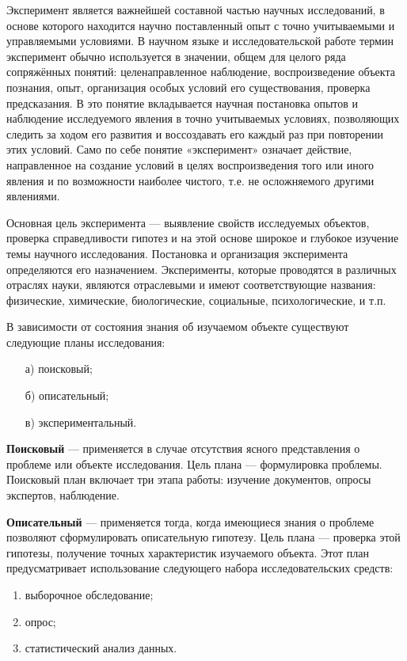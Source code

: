 Эксперимент является важнейшей составной частью научных исследований, в основе которого находится научно поставленный опыт с
точно учитываемыми и управляемыми условиями. В научном языке и
исследовательской работе термин эксперимент обычно используется в
значении, общем для целого ряда сопряжённых понятий: целенаправленное наблюдение, воспроизведение объекта познания, опыт, организация особых условий его существования, проверка предсказания. В это
понятие вкладывается научная постановка опытов и наблюдение исследуемого явления в точно учитываемых условиях, позволяющих следить за ходом его развития и воссоздавать его каждый раз при повторении
этих условий. Само по себе понятие «эксперимент» означает действие,
направленное на создание условий в целях воспроизведения того или
иного явления и по возможности наиболее чистого, т.е. не осложняемого другими явлениями. \cite{lit7}

Основная цель эксперимента --- выявление свойств исследуемых
объектов, проверка справедливости гипотез и на этой основе широкое и
глубокое изучение темы научного исследования. Постановка и организация эксперимента определяются его назначением. Эксперименты, которые проводятся в различных отраслях науки, являются отраслевыми и
имеют соответствующие названия: физические, химические, биологические, социальные, психологические, и т.п.  \cite{lit7}

В зависимости от состояния знания об изучаемом объекте существуют
следующие планы исследования:
\begin{enumerate}
	\item[а)]  поисковый;
	\item[б)]  описательный;
	\item[в)]  экспериментальный.
\end{enumerate}

\textbf{Поисковый} --- применяется в случае отсутствия ясного представления о
проблеме или объекте исследования. Цель плана --- формулировка проблемы.
Поисковый план включает три этапа работы: изучение документов, опросы
экспертов, наблюдение. \cite{lit7}

\textbf{Описательный} --- применяется тогда, когда имеющиеся знания о проблеме
позволяют сформулировать описательную гипотезу. Цель плана --- проверка этой
гипотезы, получение точных характеристик изучаемого объекта. Этот план
предусматривает использование следующего набора исследовательских средств:
\begin{enumerate}[label*=\arabic*)]
	\item выборочное обследование;
	\item опрос;
	\item статистический анализ данных.
\end{enumerate}

